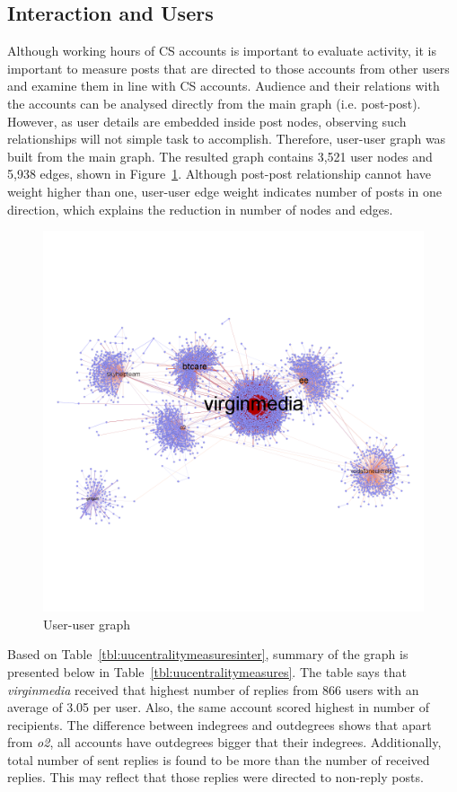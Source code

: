 \documentclass[sigconf]{acmart}
\begin{document}
\subsection{Interaction and Users}

Although working hours of CS accounts is important to evaluate
activity, it is important to measure posts that are directed to those
accounts from other users and examine them in line with CS
accounts. Audience and their relations with the accounts can be
analysed directly from the main graph (i.e. post-post). However, as
user details are embedded inside post nodes, observing such
relationships will not simple task to accomplish. Therefore, user-user
graph was built from the main graph. The resulted graph contains 3,521
user nodes and 5,938 edges, shown in
Figure~\ref{fig:userusergraph}. Although post-post relationship cannot
have weight higher than one, user-user edge weight indicates number of
posts in one direction, which explains the reduction in number of
nodes and edges.

\begin{figure}[htb]
\centering
\includegraphics[width=\columnwidth]{images/userusergraph.png}
\caption{User-user graph}
\label{fig:userusergraph}
\end{figure}

Based on Table~\ref{tbl:uucentralitymeasuresinter}, summary of the
graph is presented below in Table~\ref{tbl:uucentralitymeasures}. The
table says that {\emph{virginmedia}} received that highest number of
replies from 866 users with an average of 3.05 per user. Also, the
same account scored highest in number of recipients. The difference
between indegrees and outdegrees shows that apart from {\emph{o2}},
all accounts have outdegrees bigger that their
indegrees. Additionally, total number of sent replies is found to be
more than the number of received replies. This may reflect that those
replies were directed to non-reply posts.
\end{document}
